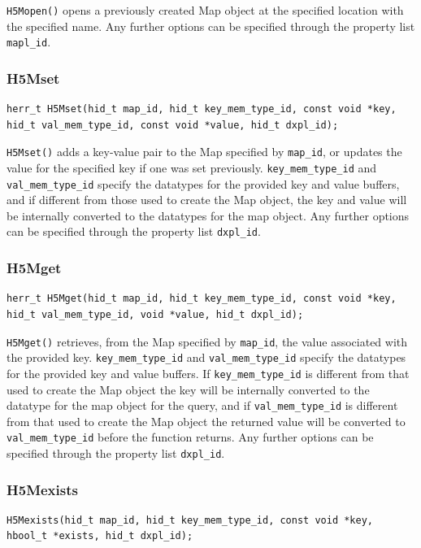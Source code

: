 \verb+H5Mopen()+ opens a previously created Map object at the specified location with the specified name. Any further options can be specified through the property list \verb+mapl_id+.

\subsubsection{H5Mset}
{
\begin{lstlisting}
herr_t H5Mset(hid_t map_id, hid_t key_mem_type_id, const void *key, hid_t val_mem_type_id, const void *value, hid_t dxpl_id);
\end{lstlisting}
}

\verb+H5Mset()+ adds a key-value pair to the Map specified by \verb+map_id+, or updates the value for the specified key if one was set previously. \verb+key_mem_type_id+ and \verb+val_mem_type_id+ specify the datatypes for the provided key and value buffers, and if different from those used to create the Map object, the key and value will be internally converted to the datatypes for the map object. Any further options can be specified through the property list \verb+dxpl_id+.

\subsubsection{H5Mget}
{
\begin{lstlisting}
herr_t H5Mget(hid_t map_id, hid_t key_mem_type_id, const void *key, hid_t val_mem_type_id, void *value, hid_t dxpl_id);
\end{lstlisting}
}

\verb+H5Mget()+ retrieves, from the Map specified by \verb+map_id+, the value associated with the provided key. \verb+key_mem_type_id+ and \verb+val_mem_type_id+ specify the datatypes for the provided key and value buffers. If \verb+key_mem_type_id+ is different from that used to create the Map object the key will be internally converted to the datatype for the map object for the query, and if \verb+val_mem_type_id+ is different from that used to create the Map object the returned value will be converted to \verb+val_mem_type_id+ before the function returns. Any further options can be specified through the property list \verb+dxpl_id+.

\subsubsection{H5Mexists}
{
\begin{lstlisting}
H5Mexists(hid_t map_id, hid_t key_mem_type_id, const void *key, hbool_t *exists, hid_t dxpl_id);
\end{lstlisting}
}

